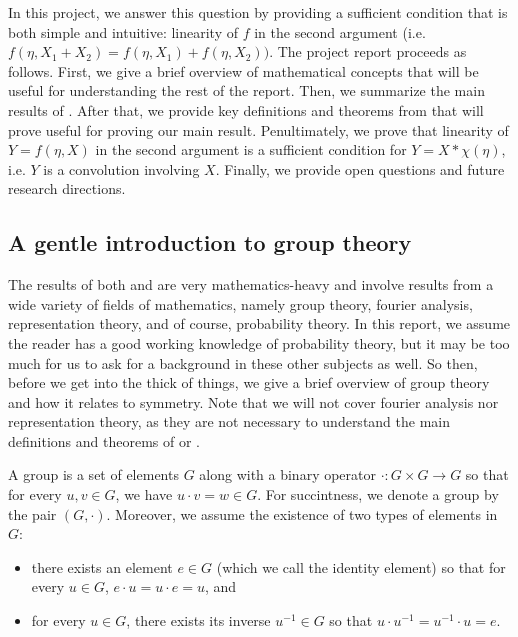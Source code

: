 In this project, we answer this question by providing a sufficient condition that is both simple and intuitive: linearity of $f$ in the second argument (i.e. $f(\eta, X_1 + X_2) = f(\eta, X_1) + f(\eta, X_2))$.
The project report proceeds as follows.
First, we give a brief overview of mathematical concepts that will be useful for understanding the rest of the report.
Then, we summarize the main results of \cite{bloemreddy2019probabilistic}.
After that, we provide key definitions and theorems from \cite{kondor2018generalization} that will prove useful for proving our main result.
Penultimately, we prove that linearity of $Y = f(\eta,X)$ in the second argument is a sufficient condition for $Y = X * \chi(\eta)$, i.e. $Y$ is a convolution involving $X$.
Finally, we provide open questions and future research directions.

\subsection{A gentle introduction to group theory}
The results of both \cite{bloemreddy2019probabilistic} and \cite{kondor2018generalization} are very mathematics-heavy and involve results from a wide variety of fields of mathematics, namely group theory, fourier analysis, representation theory, and of course, probability theory.
In this report, we assume the reader has a good working knowledge of probability theory, but it may be too much for us to ask for a background in these other subjects as well.
So then, before we get into the thick of things, we give a brief overview of group theory and how it relates to symmetry.
Note that we will not cover fourier analysis nor representation theory, as they are not necessary to understand the main definitions and theorems of \cite{bloemreddy2019probabilistic} or \cite{kondor2018generalization}.

\begin{definition}
A group is a set of elements $G$ along with a binary operator $\cdot : G \times G \to G$ so that for every $u,v \in G$, we have $u \cdot v = w \in G$.
For succintness, we denote a group by the pair $(G,\cdot)$.
Moreover, we assume the existence of two types of elements in $G$:
\begin{itemize}
	\item
	there exists an element $e \in G$ (which we call the identity element) so that for every $u \in G$, $e \cdot u = u \cdot e = u$, and
	\item
	for every $u \in G$, there exists its inverse $u^{-1} \in G$ so that $u \cdot u^{-1} = u^{-1} \cdot u = e$.
\end{itemize}
\end{definition}

